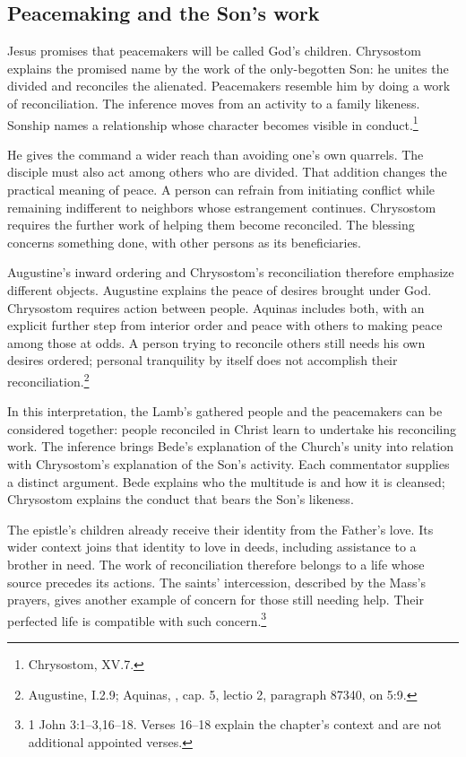 \subsection{Peacemaking and the Son's work}
Jesus promises that peacemakers will be called God's children. Chrysostom explains the promised name by the work of the only-begotten Son: he unites the divided and reconciles the alienated. Peacemakers resemble him by doing a work of reconciliation. The inference moves from an activity to a family likeness. Sonship names a relationship whose character becomes visible in conduct.\footnote{Chrysostom,  XV.7.}

He gives the command a wider reach than avoiding one's own quarrels. The disciple must also act among others who are divided. That addition changes the practical meaning of peace. A person can refrain from initiating conflict while remaining indifferent to neighbors whose estrangement continues. Chrysostom requires the further work of helping them become reconciled. The blessing concerns something done, with other persons as its beneficiaries.

Augustine's inward ordering and Chrysostom's reconciliation therefore emphasize different objects. Augustine explains the peace of desires brought under God. Chrysostom requires action between people. Aquinas includes both, with an explicit further step from interior order and peace with others to making peace among those at odds. A person trying to reconcile others still needs his own desires ordered; personal tranquility by itself does not accomplish their reconciliation.\footnote{Augustine,  I.2.9; Aquinas, , cap. 5, lectio 2, paragraph 87340, on 5:9.}

In this interpretation, the Lamb's gathered people and the peacemakers can be considered together: people reconciled in Christ learn to undertake his reconciling work. The inference brings Bede's explanation of the Church's unity into relation with Chrysostom's explanation of the Son's activity. Each commentator supplies a distinct argument. Bede explains who the multitude is and how it is cleansed; Chrysostom explains the conduct that bears the Son's likeness.

The epistle's children already receive their identity from the Father's love. Its wider context joins that identity to love in deeds, including assistance to a brother in need. The work of reconciliation therefore belongs to a life whose source precedes its actions. The saints' intercession, described by the Mass's prayers, gives another example of concern for those still needing help. Their perfected life is compatible with such concern.\footnote{1 John 3:1--3,16--18. Verses 16--18 explain the chapter's context and are not additional appointed verses.}

